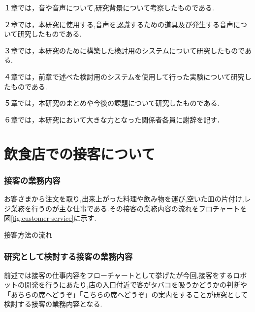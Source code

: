 \documentclass[12pt,oneside]{sotsuken_paper}
\begin{document}
１章では，音や音声について,研究背景について考察したものである.


２章では，本研究に使用する,音声を認識するための道具及び発生する音声について研究したものである.


３章では，本研究のために構築した検討用のシステムについて研究したものである.


４章では，前章で述べた検討用のシステムを使用して行った実験について研究したものである.


５章では，本研究のまとめや今後の課題について研究したものである.


６章では，本研究において大きな力となった関係者各員に謝辞を記す．
\chapter{飲食店での接客について}
\subsection{接客の業務内容}
お客さまから注文を取り,出来上がった料理や飲み物を運び,空いた皿の片付け,レジ業務を行うのが主な仕事である.その接客の業務内容の流れをフロチャートを図\ref{fig:customer-service}に示す.

\documentstyle
\begin{center}
\scriptsize
{}
%
\caption{接客方法の流れ}
\label{fig:customer-service}
\end{center}
\normalsize


\subsection{研究として検討する接客の業務内容}
前述では接客の仕事内容をフローチャートとして挙げたが今回,接客をするロボットの開発を行うにあたり,店の入口付近で客がタバコを吸うかどうかの判断や「あちらの席へどうぞ」「こちらの席へどうぞ」の案内をすることが研究として検討する接客の業務内容となる.
\end{document}
